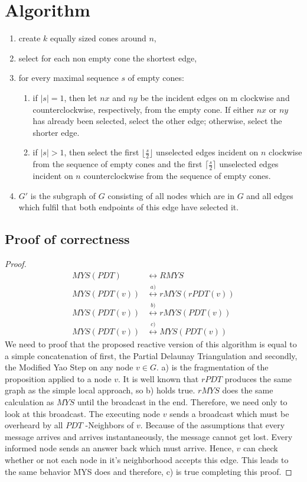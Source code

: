 \section{Algorithm}


\begin{enumerate}
\item create $k $ equally sized cones around $n $,
\item select for each non empty cone the shortest edge,
\item for every maximal sequence $s $ of empty cones:
\begin{enumerate}
	\item if $|s|=1 $, then let $nx $ and $ny $ be the incident edges on m clockwise and counterclockwise, respectively, from the empty cone.
	If either $nx $ or $ny $ has already been selected, select the other edge;
	otherwise, select the shorter edge.
\item if $|s| > 1 $, then select the first $\lfloor \frac{s}{2} \rfloor $ unselected edges incident on $n $ clockwise from the sequence of empty cones and the first $\lceil \frac{s}{2} \rceil $ unselected edges incident on $n $ counterclockwise from the sequence of empty cones.
\end{enumerate}
\item $ G' $ is the subgraph of $G $ consisting of all nodes which are in $G $ and all edges which fulfil that both endpoints of this edge have selected it.  
\end{enumerate}


\subsection{Proof of correctness}
\begin{proof}
\begin{equation*}
\begin{split}
	MYS(PDT) &\leftrightarrow RMYS\\
	MYS(PDT(v)) &\stackrel{a)}{\leftrightarrow} rMYS(rPDT(v)) \\
    MYS(PDT(v)) &\stackrel{b)}{\leftrightarrow} rMYS(PDT(v))\\
    MYS(PDT(v)) &\stackrel{c)}{\leftrightarrow} MYS(PDT(v)) 
\end{split}
\end{equation*}
We need to proof that the proposed reactive version of this algorithm is equal to a simple concatenation of first, the Partial Delaunay Triangulation and secondly, the Modified Yao Step on any node $v \in G$.
a) is the fragmentation of the proposition applied to a node $v $.
It is well known that $rPDT $ produces the same graph as the simple local approach, so b) holds true.
$rMYS $ does the same calculation as $MYS $ until the broadcast in the end.
Therefore, we need only to look at this broadcast.
The executing node $v $ sends a broadcast which must be overheard by all $PDT $ -Neighbors of $v $.
Because of the assumptions that every message arrives and arrives instantaneously, the message cannot get lost.
Every informed node sends an answer back which must arrive.
Hence, $v $ can check whether or not each node in it's neighborhood accepts this edge.
This leads to the same behavior MYS does and therefore, c) is true completing this proof.
\end{proof}
